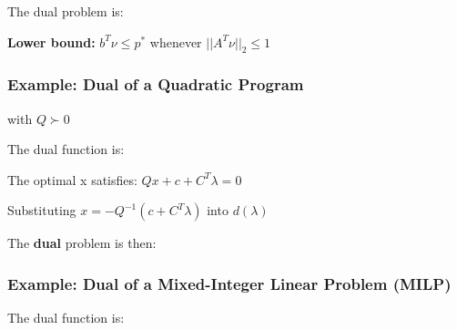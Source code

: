\documentclass[8pt,a4paper]{scrartcl}
\begin{document}
\begin{multicols*}{3}
The dual problem is:


\textbf{Lower bound:} $b^T\nu\leq p^\ast$ whenever $||A^T\nu||_2\leq 1$

\subsubsection{Example: Dual of a Quadratic Program}


with $Q\succ 0$

\finn

The dual function is:


The optimal x satisfies: $Qx+c+C^T\lambda=0$

\finn

Substituting $x=-Q^{-1}(c+C^T\lambda)$ into $d(\lambda)$


The \textbf{dual} problem is then: 



\subsubsection{Example: Dual of a Mixed-Integer Linear Problem (MILP)}


The dual function is:



\end{multicols*}
\end{document}
